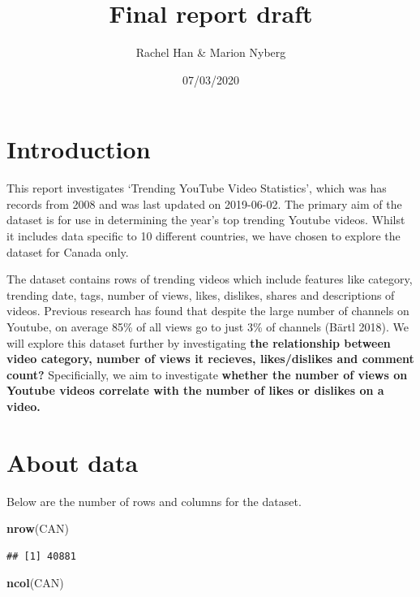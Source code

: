 \documentclass[]{article}
\title{Final report draft}
\author{Rachel Han \& Marion Nyberg}
\date{07/03/2020}
\newenvironment{Shaded}{\begin{snugshade}}{\end{snugshade}}
\newcommand{\KeywordTok}[1]{\textcolor[rgb]{0.13,0.29,0.53}{\textbf{#1}}}
\newcommand{\NormalTok}[1]{#1}
\begin{document}
\maketitle

{
\setcounter{tocdepth}{2}
\tableofcontents
}
\hypertarget{introduction}{%
\section{Introduction}\label{introduction}}

This report investigates `Trending YouTube Video Statistics', which was
has records from 2008 and was last updated on 2019-06-02. The primary
aim of the dataset is for use in determining the year's top trending
Youtube videos. Whilst it includes data specific to 10 different
countries, we have chosen to explore the dataset for Canada only.

The dataset contains rows of trending videos which include features like
category, trending date, tags, number of views, likes, dislikes, shares
and descriptions of videos. Previous research has found that despite the
large number of channels on Youtube, on average 85\% of all views go to
just 3\% of channels (Bärtl 2018). We will explore this dataset further
by investigating \textbf{the relationship between video category, number
of views it recieves, likes/dislikes and comment count?} Specificially,
we aim to investigate \textbf{whether the number of views on Youtube
videos correlate with the number of likes or dislikes on a video.}

\hypertarget{about-data}{%
\section{About data}\label{about-data}}

Below are the number of rows and columns for the dataset.

\begin{Shaded}
\begin{Highlighting}[]
\KeywordTok{nrow}\NormalTok{(CAN) }
\end{Highlighting}
\end{Shaded}

\begin{verbatim}
## [1] 40881
\end{verbatim}

\begin{Shaded}
\begin{Highlighting}[]
\KeywordTok{ncol}\NormalTok{(CAN)}
\end{Highlighting}
\end{Shaded}
\end{document}
